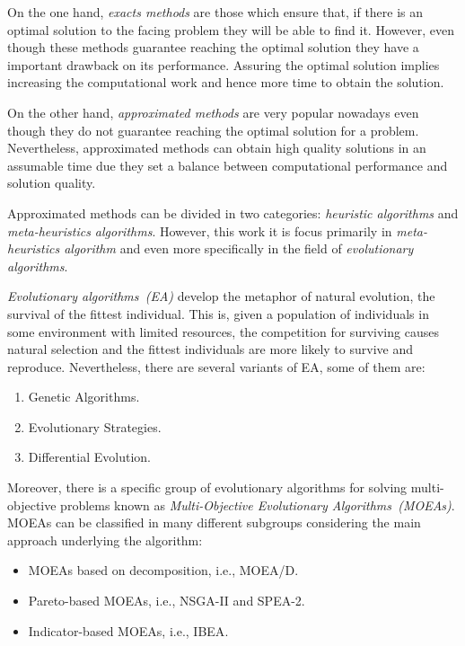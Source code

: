 On the one hand, \textit{exacts methods} are those which ensure that, if there is an optimal solution to the facing problem they will be able to find it. However, even though these methods guarantee reaching the optimal solution they have a important drawback on its performance. Assuring the optimal solution implies increasing the computational work and hence more time to obtain the solution.

On the other hand, \textit{approximated methods} are very popular nowadays even though they do not guarantee reaching the optimal solution for a problem. Nevertheless, approximated methods can obtain high quality solutions in an assumable time due they set a balance between computational performance and solution quality. 

Approximated methods can be divided in two categories: \textit{heuristic algorithms} and \textit{meta-heuristics algorithms}. However, this work it is focus primarily in \textit{meta-heuristics algorithm} and even more specifically in the field of \textit{evolutionary algorithms}.

\textit{Evolutionary algorithms~(EA)} develop the metaphor of natural evolution, the survival of the fittest individual\cite{eiben}. This is, given a population of individuals in some environment with limited resources, the competition for surviving causes natural selection and the fittest individuals are more likely to survive and reproduce. Nevertheless, there are several variants of EA, some of them are:
\begin{enumerate}
    \item Genetic Algorithms\cite{Whitley1994, Algorithms2004, Sivanandam2008}.
    \item Evolutionary Strategies\cite{Beyer2002, Hansen2017}.
    \item Differential Evolution\cite{Algorithm2006, DE1, DE2, DE3}.
\end{enumerate}

Moreover, there is a specific group of evolutionary algorithms for solving multi-objective problems known as \textit{Multi-Objective Evolutionary Algorithms~(MOEAs)}. MOEAs can be classified in many different subgroups considering the main approach underlying the algorithm\cite{ZHOU201132}:
\begin{itemize}
    \item MOEAs based on decomposition, i.e., MOEA/D\cite{Zhang2007, Ma2018}.
    \item Pareto-based MOEAs, i.e., NSGA-II\cite{996017} and SPEA-2\cite{Laumanns2001SPEA2}.
    \item Indicator-based MOEAs, i.e., IBEA\cite{IBEA}.
\end{itemize}

